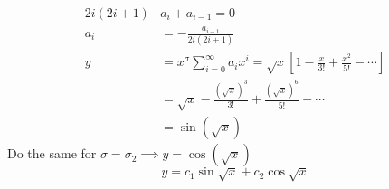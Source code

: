 \documentclass[Maths.tex]{subfiles}
\begin{document}
\begin{example}
\begin{align}
    2i(2i+1)&a_i + a_{i-1} = 0 \\
    a_i &= -\frac{a_{i-1}}{2i(2i+1)} \\
    y &= x^\sigma \sum_{i=0}^\infty a_ix^i = \sqrt{x}\left[1 - \frac{x}{3!} + \frac{x^2}{5!} - \cdots \right] \\
    &= \sqrt{x} - \frac{(\sqrt{x})^3}{3!} + \frac{(\sqrt{x})^6}{5!} - \cdots \\
    &= \sin(\sqrt{x})
\end{align}
Do the same for $\sigma = \sigma_2 \implies y = \cos(\sqrt{x})$
\begin{equation}
    y = c_1\sin\sqrt{x} + c_2\cos\sqrt{x}
\end{equation}
\end{example}

\chapter{}
\end{document}
